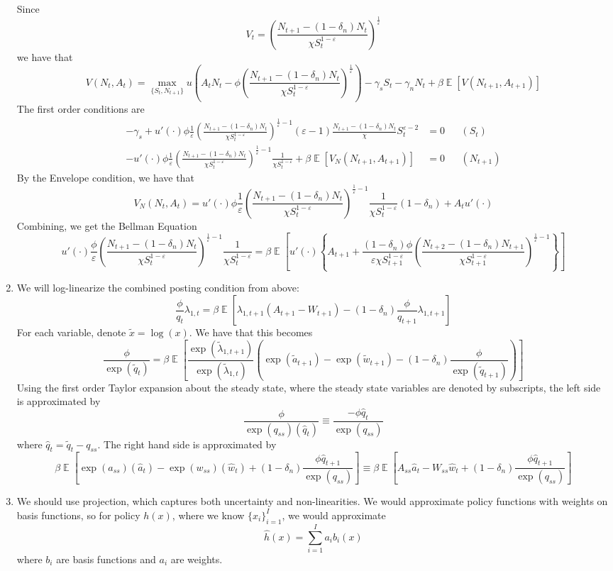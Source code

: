 \documentclass[10pt]{article}
\newcommand{\expect}{\mathop{\mathbb{E}}} %
\newcommand{\parl}{\left(}
\newcommand{\parr}{\right)}
\newcommand{\barl}{\left[}
\newcommand{\barr}{\right]}
\newcommand{\curll}{\left\{}
\newcommand{\curlr}{\right\}}
\theoremstyle{plain}
\theoremstyle{definition}
\begin{document}
\begin{enumerate}
\[	\]
	Since 
	\[
	V_t = \parl \frac{N_{t+1}-(1-\delta_n)N_t}{\chi S_t^{1-\varepsilon}}\parr^\frac{1}{\varepsilon}
	\]
	we have that
	\[
	V(N_t,A_t) = \max_{\{S_t,N_{t+1}\}} u\parl A_t N_t - \phi  \parl \frac{N_{t+1}-(1-\delta_n)N_t}{\chi S_t^{1-\varepsilon}}\parr^\frac{1}{\varepsilon}\parr - \gamma_sS_t - \gamma_nN_t + \beta \expect \barl V(N_{t+1},A_{t+1})\barr
	\]
	The first order conditions are
	\begin{align*}
		-\gamma_s + u'(\cdot) \phi \frac{1}{\varepsilon} \parl \frac{N_{t+1}-(1-\delta_n)N_t}{\chi S_t^{1-\varepsilon}}\parr^{\frac{1}{\varepsilon}-1} (\varepsilon - 1) \frac{N_{t+1}-(1-\delta_n)N_t}{\chi}S_t^{\varepsilon-2} &= 0 &&(S_t) \\
		-u'(\cdot)\phi \frac{1}{\varepsilon} \parl \frac{N_{t+1}-(1-\delta_n)N_t}{\chi S_t^{1-\varepsilon}}\parr^{\frac{1}{\varepsilon}-1} \frac{1}{\chi S_t^{1-\varepsilon}} + \beta \expect\barl V_N(N_{t+1},A_{t+1})\barr &= 0 &&(N_{t+1})
	\end{align*}
	By the Envelope condition, we have that
	\[
	V_N(N_{t},A_{t}) = u'(\cdot) \phi \frac{1}{\varepsilon} \parl \frac{N_{t+1}-(1-\delta_n)N_t}{\chi S_t^{1-\varepsilon}}\parr^{\frac{1}{\varepsilon}-1} \frac{1}{\chi S_t^{1-\varepsilon}} (1-\delta_n) + A_tu'(\cdot)
	\]
	Combining, we get the Bellman Equation
	\[
	u'(\cdot)\frac{\phi}{\varepsilon} \parl \frac{N_{t+1}-(1-\delta_n)N_t}{\chi S_t^{1-\varepsilon}}\parr^{\frac{1}{\varepsilon}-1} \frac{1}{\chi S_t^{1-\varepsilon}} = \beta \expect\barl u'(\cdot) \curll A_{t+1} + \frac{(1-\delta_n)\phi}{\varepsilon \chi S_{t+1}^{1-\varepsilon}} \parl \frac{N_{t+2}-(1-\delta_n)N_{t+1}}{\chi S_{t+1}^{1-\varepsilon}}\parr^{\frac{1}{\varepsilon}-1}\curlr \barr
	\]
	\item We will log-linearize the combined posting condition from above:
	\[
	\frac{\phi}{q_t}\lambda_{1,t} = \beta \expect \barl \lambda_{1,t+1}(A_{t+1}-W_{t+1}) - (1-\delta_n) \frac{\phi}{q_{t+1}}\lambda_{1,t+1} \barr
	\]
	For each variable, denote $\tilde{x} = \log(x)$. We have that this becomes
	\[
	\frac{\phi}{\exp(\tilde{q}_t)} = \beta \expect \barl \frac{\exp(\tilde{\lambda}_{1,t+1})}{\exp(\tilde{\lambda}_{1,t})}\parl \exp(\tilde{a}_{t+1}) - \exp(\tilde{w}_{t+1}) - (1-\delta_n)\frac{\phi}{\exp(\tilde{q}_{t+1})}\parr\barr
	\]
	Using the first order Taylor expansion about the steady state, where the steady state variables are denoted by subscripts, the left side is approximated by
	\[
	\frac{\phi}{\exp(q_{ss})(\hat{q}_t)} \equiv \frac{-\phi \hat{q}_t}{\exp(q_{ss})}
	\]
	where $\hat{q}_t = \tilde{q}_t - q_{ss}$. The right hand side is approximated by
	\[
	\beta \expect \barl \exp(a_{ss}) (\hat{a}_t) - \exp(w_{ss}) (\hat{w}_t) + (1-\delta_n) \frac{\phi \hat{q}_{t+1}}{\exp(q_{ss})}\barr \equiv \beta \expect \barl A_{ss}\hat{a}_t - W_{ss} \hat{w}_t + (1-\delta_n) \frac{\phi \hat{q}_{t+1}}{\exp(q_{ss})}\barr
	\]
	\item We should use projection, which captures both uncertainty and non-linearities. We would approximate policy functions with weights on basis functions, so for policy $h(x)$, where we know $\{x_i\}_{i=1}^I$, we would approximate
	\[
	\hat{h}(x) = \sum_{i=1}^I a_i b_i(x)
	\]
	where $b_i$ are basis functions and $a_i$ are weights. 
	

\end{enumerate}
\end{document}
